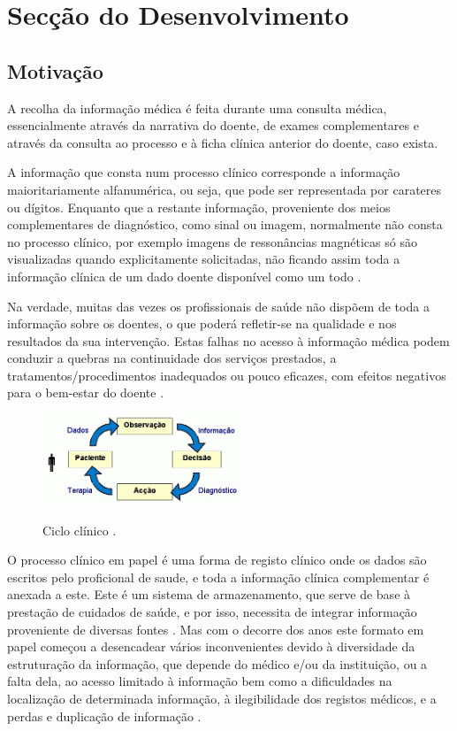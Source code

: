 \documentclass[conference]{IEEEtran}
\begin{document}
\section{Secção do Desenvolvimento}

\subsection{Motivação}

A recolha da informação médica é feita durante uma consulta médica, essencialmente através da narrativa do doente, de exames complementares e através da consulta ao processo e à ficha clínica anterior do doente, caso exista.

A informação que consta num processo clínico corresponde a informação maioritariamente alfanumérica, ou seja, que pode ser representada por carateres ou dígitos. Enquanto que a restante informação, proveniente dos meios complementares de diagnóstico, como sinal ou imagem, normalmente não consta no processo clínico, por exemplo imagens de ressonâncias magnéticas só são visualizadas quando explicitamente solicitadas, não ficando assim toda a informação clínica de um dado doente disponível como um todo \cite{santos2010comunicaccao}.

Na verdade, muitas das vezes os profissionais de saúde não dispõem de toda a informação sobre os doentes, o que poderá refletir-se na qualidade e nos resultados da sua intervenção. Estas falhas no acesso à informação médica podem conduzir a quebras na continuidade dos serviços prestados, a tratamentos/procedimentos inadequados ou pouco eficazes, com efeitos negativos para o bem-estar do doente \cite{santos2010comunicaccao}. 

\begin{figure}[!ht]
    \centering
    \begin{minipage}{.9\textwidth}
        \includegraphics[width=0.53\textwidth]{diagnostico_terapeutica.png}
        \label{fig1}
    \end{minipage}%
    \caption{Ciclo clínico \cite{regclinelect}.}
\end{figure}
 
O processo clínico em papel é uma forma de registo clínico onde os dados são escritos pelo proficional de saude, e toda a informação clínica complementar é anexada a este. Este é um sistema de armazenamento, que serve de base à prestação de cuidados de saúde, e por isso, necessita de integrar informação proveniente de diversas fontes \cite{regclinelect}. Mas com o decorre dos anos este formato em papel começou a desencadear vários inconvenientes devido à diversidade da estruturação da informação, que depende do médico e/ou da instituição, ou a falta dela, ao acesso limitado à informação bem como a dificuldades na localização de determinada informação, à ilegibilidade dos registos médicos, e a perdas e duplicação de informação \cite{regclinelect}.
\end{document}
